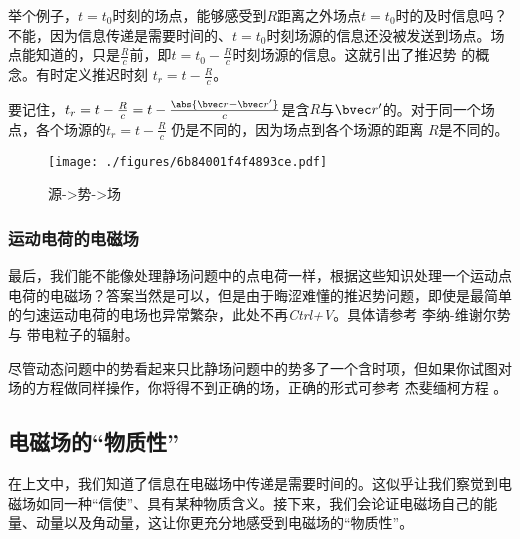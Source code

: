 举个例子，$t=t_0$时刻的场点，能够感受到$R$距离之外场点$t=t_0$时的及时信息吗？不能，因为信息传递是需要时间的、$t=t_0$时刻场源的信息还没被发送到场点。场点能知道的，只是$\frac{R}{c}$前，即$t=t_0-\frac{R}{c}$时刻场源的信息。这就引出了推迟势  的概念。有时定义推迟时刻 $t_r = t - \frac{R}{c}$。

要记住，$t_r = t-\frac{R}{c} = t-\frac{\abs{\bvec r-\bvec r'}}{c}$是含$R$与$\bvec r'$的。对于同一个场点，各个场源的$t_r = t - \frac{R}{c}$ 仍是不同的，因为场点到各个场源的距离 $R$是不同的。

\begin{figure}[ht]
\centering
\texttt{[image: ./figures/6b84001f4f4893ce.pdf]}
\caption{源->势->场} \label{fig_dynfld_6}
\end{figure}

\subsubsection{运动电荷的电磁场}
最后，我们能不能像处理静场问题中的点电荷一样，根据这些知识处理一个运动点电荷的电磁场？答案当然是可以，但是由于晦涩难懂的推迟势问题，即使是最简单的匀速运动电荷的电场也异常繁杂，此处不再\textsl{Ctrl+V}。具体请参考 李纳-维谢尔势 与 带电粒子的辐射。

尽管动态问题中的势看起来只比静场问题中的势多了一个含时项，但如果你试图对场的方程做同样操作，你将得不到正确的场，正确的形式可参考 杰斐缅柯方程 \cite{GriffE}。

\subsection{电磁场的“物质性”}
在上文中，我们知道了信息在电磁场中传递是需要时间的。这似乎让我们察觉到电磁场如同一种“信使”、具有某种物质含义。接下来，我们会论证电磁场自己的能量、动量以及角动量，这让你更充分地感受到电磁场的“物质性”。

